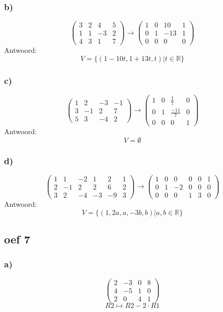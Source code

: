 \documentclass[10pt,a4paper]{article}
\begin{document}
\subsubsection*{b)}
\[
\begin{pmatrix}
3 &  2 &  4 &  5\\
1 &  1 & -3 &  2\\
4 &  3 &  1 &  7
\end{pmatrix}
\longrightarrow
\begin{pmatrix}
1 &  0 & 10 &  1\\
0 &  1 & -13&  1\\
0 &  0 &  0 &  0
\end{pmatrix}
\]
Antwoord:
\[
V=\{(1-10t,1+13t,t) | t \in \mathbb{R}\}
\]

\subsubsection*{c)}
\[
\begin{pmatrix}
1 &  2 & -3 & -1\\
3 & -1 &  2 &  7\\
5 &  3 & -4 &  2
\end{pmatrix}
\longrightarrow
\begin{pmatrix}
1 &  0 & \frac{1}{7} &  0\\
0 &  1 & \frac{-11}{7}&  0\\
0 &  0 &  0 &  1
\end{pmatrix}
\]
Antwoord:
\[
V=\emptyset
\]

\subsubsection*{d)}
\[
\begin{pmatrix}
1 &  1 & -2 &  1 &  2 & 1\\
2 & -1 &  2 &  2 &  6 & 2\\
3 &  2 & -4 & -3 & -9 & 3
\end{pmatrix}
\longrightarrow
\begin{pmatrix}
1 &  0 &  0 &  0 &  0 & 1\\
0 &  1 & -2 &  0 &  0 & 0\\
0 &  0 &  0 &  1 &  3 & 0
\end{pmatrix}
\]
Antwoord:
\[
V=\{(1,2a,a,-3b,b) | a,b \in \mathbb{R} \}
\]

\subsection*{oef 7}
\subsubsection*{a)}
\[
\begin{pmatrix}
2 & -3 & 0 & 8\\
4 & -5 & 1 & 0\\
2 & 0 & 4 & 1
\end{pmatrix}
\]
\[ R2 \longmapsto R2 - 2\cdot R1\]
\end{document}
